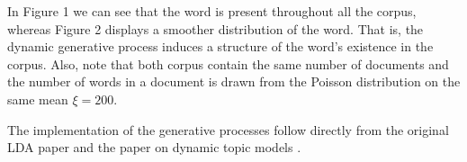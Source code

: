\documentclass{article}
\begin{document}
In Figure 1 we can see that the word is present throughout all the corpus, whereas Figure 2 displays a smoother distribution of the word. That is, the dynamic generative process induces a structure of the word's existence in the corpus. Also, note that both corpus contain the same number of documents and the number of words in a document is drawn from the Poisson distribution on the same mean $\xi = 200$.

The implementation of the generative processes follow directly from the original LDA paper \cite{Blei:2003:LDA:944919.944937} and the paper on dynamic topic models \cite{Blei:2006:DTM:1143844.1143859}. 



\end{document}
